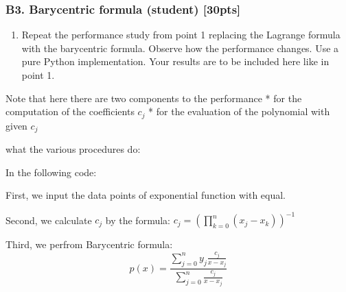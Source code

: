 \documentclass[11pt]{article}
\providecommand{\tightlist}{%
      \setlength{\itemsep}{0pt}\setlength{\parskip}{0pt}}
\begin{document}
    \subsubsection{B3. Barycentric formula (student)
{[}30pts{]}}\label{b3.-barycentric-formula-student-30pts}

\begin{enumerate}
\def\labelenumi{\arabic{enumi}.}
\setcounter{enumi}{1}
\tightlist
\item
  Repeat the performance study from point 1 replacing the Lagrange
  formula with the barycentric formula. Observe how the performance
  changes. Use a pure Python implementation. Your results are to be
  included here like in point 1.
\end{enumerate}

Note that here there are two components to the performance * for the
computation of the coefficients \(c_j\) * for the evaluation of the
polynomial with given \(c_j\)

    what the various procedures do:

In the following code:

First, we input the data points of exponential function with equal.

Second, we calculate \(c_j\) by the formula:
\(c_j = \left(\prod_{k=0}^n (x_j-x_k)\right)^{-1}\)

Third, we perfrom Barycentric formula:
\[p(x) = \frac{\sum_{j=0}^n y_j \frac{c_j}{x-x_j}}{\sum_{j=0}^n \frac{c_j}{x-x_j}}\]
\end{document}
